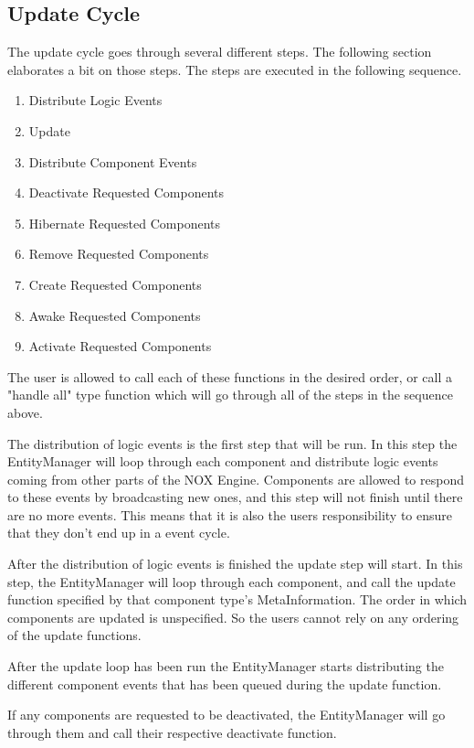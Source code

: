 \subsection{Update Cycle}
The update cycle goes through several different steps. The following section elaborates a bit on those steps. The steps are executed in the following sequence.
\begin{enumerate}
    \item Distribute Logic Events
    \item Update
    \item Distribute Component Events
    \item Deactivate Requested Components
    \item Hibernate Requested Components
    \item Remove Requested Components
    \item Create Requested Components
    \item Awake Requested Components
    \item Activate Requested Components
\end{enumerate}

The user is allowed to call each of these functions in the desired order, 
or call a "handle all" type function which will go through all of the steps in the sequence above.

The distribution of logic events is the first step that will be run.
In this step the EntityManager will loop through each component and distribute logic events coming from other parts of the NOX Engine. 
Components are allowed to respond to these events by broadcasting new ones, 
and this step will not finish until there are no more events.
This means that it is also the users responsibility to ensure that they don't
end up in a event cycle.

After the distribution of logic events is finished the update step will start. In this step, the EntityManager will loop through each component,
and call the update function specified by that component type's MetaInformation.
The order in which components are updated is unspecified. So the users cannot rely on any ordering of the update functions.

After the update loop has been run the EntityManager starts distributing the different component events that has been queued during the update function.

If any components are requested to be deactivated, the EntityManager will go through them and call their respective deactivate function.

